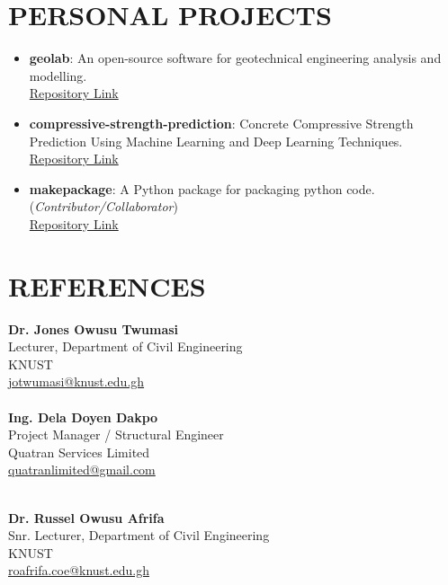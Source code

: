 \documentclass[letterpaper, 12pt]{article}
\newcommand{\cvsection}[1]{

	\section*{#1}
}
\begin{document}

	\cvsection{PERSONAL PROJECTS}

	\begin{itemize}[leftmargin=*]

		\item \textbf{geolab}: An open-source software for geotechnical engineering analysis and modelling. \\ \href{https://www.github.com/patrickboateng/geolab}{Repository Link}

		\item \textbf{compressive-strength-prediction}: Concrete Compressive Strength Prediction Using Machine Learning and Deep Learning Techniques. \href{https://github.com/patrickboateng/compressive-strength-prediction}{Repository Link}

		\item \textbf{makepackage}: A Python package for packaging python code. (\textit{Contributor/Collaborator}) \\
		\href{https://github.com/nyggus/makepackage/graphs/contributors}{Repository Link}

	\end{itemize}


	\cvsection{REFERENCES}


	\begin{multicols}{2}
		\textbf{Dr. Jones Owusu Twumasi} \\
		Lecturer, Department of Civil Engineering \\
		KNUST \\
		\faEnvelopeSquare \space \href{mailto:jotwumasi@knust.edu.gh}{jotwumasi@knust.edu.gh} \\
		\faPhone {} \\

		\textbf{Ing. Dela Doyen Dakpo} \\
		Project Manager / Structural Engineer \\
		Quatran Services Limited \\
		\faEnvelopeSquare \space \href{mailto:quatranlimited@gmail.com}{quatranlimited@gmail.com} \\
		\faPhone {} \\

		\columnbreak

		\textbf{Dr. Russel Owusu Afrifa} \\
		Snr. Lecturer, Department of Civil Engineering \\
		KNUST \\
		\faEnvelopeSquare \space \href{mailto:roafrifa.coe@knust.edu.gh}{roafrifa.coe@knust.edu.gh} \\
		\faPhone {} \\

	\end{multicols}
\end{document}
